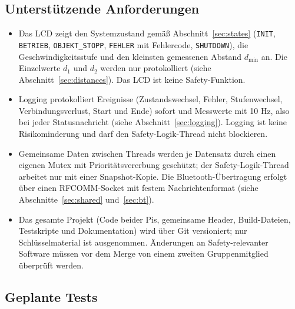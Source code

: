 \subsection{Unterstützende Anforderungen}

\begin{itemize}
    \item Das LCD zeigt den Systemzustand gemäß Abschnitt~\ref{sec:states} (\texttt{INIT}, \texttt{BETRIEB}, \texttt{OBJEKT\_STOPP}, \texttt{FEHLER} mit Fehlercode, \texttt{SHUTDOWN}), die Geschwindigkeitsstufe und den kleinsten gemessenen Abstand $d_{\min}$ an. Die Einzelwerte $d_1$ und $d_2$ werden nur protokolliert (siehe Abschnitt~\ref{sec:distances}). Das LCD ist keine Safety-Funktion.
    \item Logging protokolliert Ereignisse (Zustandswechsel, Fehler, Stufenwechsel, Verbindungsverlust, Start und Ende) sofort und Messwerte mit 10 Hz, also bei jeder Statusnachricht (siehe Abschnitt~\ref{sec:logging}). Logging ist keine Risikominderung und darf den Safety-Logik-Thread nicht blockieren.
    \item Gemeinsame Daten zwischen Threads werden je Datensatz durch einen eigenen Mutex mit Prioritätsvererbung geschützt; der Safety-Logik-Thread arbeitet nur mit einer Snapshot-Kopie. Die Bluetooth-Übertragung erfolgt über einen RFCOMM-Socket mit festem Nachrichtenformat (siehe Abschnitte~\ref{sec:shared} und~\ref{sec:bt}).
    \item Das gesamte Projekt (Code beider Pis, gemeinsame Header, Build-Dateien, Testskripte und Dokumentation) wird über Git versioniert; nur Schlüsselmaterial ist ausgenommen. Änderungen an Safety-relevanter Software müssen vor dem Merge von einem zweiten Gruppenmitglied überprüft werden.
\end{itemize}

\subsection{Geplante Tests}


